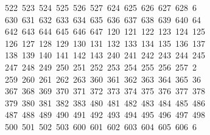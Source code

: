 \begin{tabbing}
\ 522\ 523\ 524\ 525\ 526\ 527\ 624\ 625\ 626\ 627\ 628\ 6\\[0pt]
\ 630\ 631\ 632\ 633\ 634\ 635\ 636\ 637\ 638\ 639\ 640\ 64\\[0pt]
\ 642\ 643\ 644\ 645\ 646\ 647\ 120\ 121\ 122\ 123\ 124\ 125\\[0pt]
\>\ 126\ 127\ 128\ 129\ 130\ 131\ 132\ 133\ 134\ 135\ 136\ 137\\[0pt]
\>\ 138\ 139\ 140\ 141\ 142\ 143\ 240\ 241\ 242\ 243\ 244\ 245\ \\[0pt]
\ 247\ 248\ 249\ 250\ 251\ 252\ 253\ 254\ 255\ 256\ 257\ 2\\[0pt]
\ 259\ 260\ 261\ 262\ 263\ 360\ 361\ 362\ 363\ 364\ 365\ 36\\[0pt]
\ 367\ 368\ 369\ 370\ 371\ 372\ 373\ 374\ 375\ 376\ 377\ 378\\[0pt]
\>\ 379\ 380\ 381\ 382\ 383\ 480\ 481\ 482\ 483\ 484\ 485\ 486\\[0pt]
\>\ 487\ 488\ 489\ 490\ 491\ 492\ 493\ 494\ 495\ 496\ 497\ 498\ \\[0pt]
\ 500\ 501\ 502\ 503\ 600\ 601\ 602\ 603\ 604\ 605\ 606\ 6\\[0pt]

\end{tabbing}
